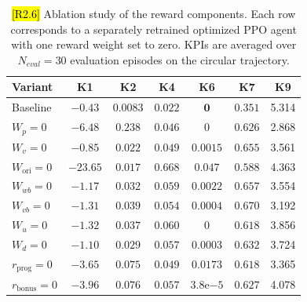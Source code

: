 \documentclass{ieeeaccess}
\newcommand{\hltwo}[1]{{\sethlcolor{rtwo}\hl{#1}}}
\begin{document}
\begin{table}[!t]
    \centering
    \caption{\hltwo{[R2.6]} Ablation study of the reward components. Each row corresponds to a separately retrained optimized PPO
    agent with one reward weight set to zero. KPIs are averaged over $N_{eval}=30$ evaluation episodes on the circular trajectory.}
    \label{tab:reward_ablation}
    \renewcommand{\arraystretch}{1.2}
    \setlength{\tabcolsep}{3pt}
    \begin{tabular}{lcccccc}
        \toprule
        \textbf{Variant} & \textbf{K1} & \textbf{K2} & \textbf{K4} & \textbf{K6} & \textbf{K7} & \textbf{K9} \\
        \midrule
        Baseline            & $\mathbf{-0.43}$   & $\mathbf{0.0083}$ & $\mathbf{0.022}$ & $\mathbf{0}$      & $\mathbf{0.351}$ & 5.314 \\
        $W_p = 0$           & $-6.48$            & $0.238$           & $0.046$          & $0$               & $0.626$          & 2.868 \\
        $W_v = 0$           & $-0.85$            & $0.022$           & $0.049$          & $0.0015$          & $0.655$          & 3.561 \\
        $W_{\mathrm{ori}}=0$& $-23.65$            & $0.017$           & $0.668$          & $0.047$           & $0.588$          & 4.363 \\
        $W_{wb} = 0$        & $-1.17$            & $0.032$           & $0.059$          & $0.0022$          & $0.657$          & 3.554 \\
        $W_{vb} = 0$        & $-1.31$            & $0.039$           & $0.054$          & $0.0004$          & $0.670$          & 3.192 \\
        $W_u = 0$           & $-1.32$            & $0.037$           & $0.060$          & $0$               & $0.618$          & 3.856 \\
        $W_d = 0$           & $-1.10$            & $0.029$           & $0.057$          & $0.0003$          & $0.632$          & 3.724 \\
        $r_{\text{prog}} = 0$   & $-3.65$        & $0.075$           & $0.049$          & $0.0173$          & $0.618$          & 3.365 \\
        $r_{\text{bonus}} = 0$  & $-3.96$        & $0.076$           & $0.057$          & $3.8\mathrm{e}{-5}$ & $0.627$        & 4.078 \\
        \bottomrule
    \end{tabular}
\end{table}
\end{document}
